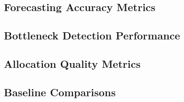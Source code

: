 \subsection{Forecasting Accuracy Metrics}

\subsection{Bottleneck Detection Performance}

\subsection{Allocation Quality Metrics}

\subsection{Baseline Comparisons}
